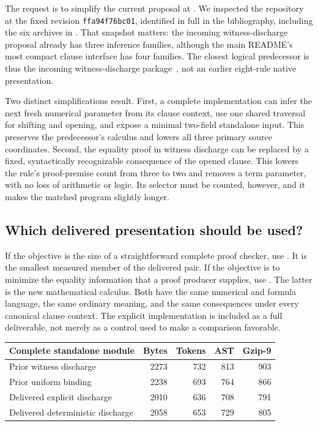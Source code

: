 \documentclass[11pt,letterpaper]{article}
\theoremstyle{definition}\newtheorem{definition}[theorem]{Definition}
\theoremstyle{remark}\newtheorem{remark}[theorem]{Remark}
\begin{document}
The request is to simplify the current proposal at
. We inspected the
repository at the fixed revision
\texttt{ffa94f76bc01}, identified in full in the bibliography, including the six
archives in . That snapshot matters: the incoming
witness-discharge proposal already has three inference families, although
the main README's most compact clause interface has four families.
The closest logical predecessor is thus the incoming witness-discharge
package~\cite{prior}, not an earlier eight-rule native presentation.

Two distinct simplifications result. First, a complete implementation can
infer the next fresh numerical parameter from its clause context, use one
shared traversal for shifting and opening, and expose a minimal two-field
standalone input. This preserves the predecessor's calculus and lowers all
three primary source coordinates. Second, the equality proof in witness
discharge can be replaced by a fixed, syntactically recognizable consequence
of the opened clause. This lowers the rule's proof-premise count from three
to two and removes a term parameter, with no loss of arithmetic or logic.
Its selector must be counted, however, and it makes the matched program
slightly longer.

\subsection{Which delivered presentation should be used?}

If the objective is the size of a straightforward complete proof checker,
use . It is the smallest measured member of
the delivered pair. If the objective is to minimize the equality information
that a proof producer supplies, use
. The latter is the new mathematical
calculus. Both have the same numerical and formula language, the same
ordinary meaning, and the same consequences under every canonical clause
context. The explicit implementation is included as a full deliverable,
not merely as a control used to make a comparison favorable.

\begin{center}
\small
\begin{tabular}{@{}lrrrr@{}}
\toprule
Complete standalone module & Bytes & Tokens & AST & Gzip-9\\
\midrule
Prior witness discharge & 2273 & 732 & 813 & 903\\
Prior uniform binding & 2238 & 693 & 764 & 866\\
Delivered explicit discharge & 2010 & 636 & 708 & 791\\
Delivered deterministic discharge & 2058 & 653 & 729 & 805\\
\bottomrule
\end{tabular}
\end{center}
\end{document}
